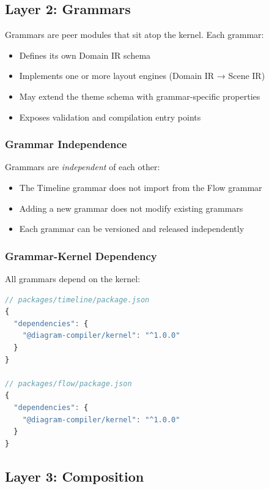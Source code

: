 \subsection{Layer 2: Grammars}
\label{sec:arch-grammars}

Grammars are peer modules that sit atop the kernel. Each grammar:

\begin{itemize}
  \item Defines its own Domain IR schema
  \item Implements one or more layout engines (Domain IR → Scene IR)
  \item May extend the theme schema with grammar-specific properties
  \item Exposes validation and compilation entry points
\end{itemize}

\subsubsection{Grammar Independence}

Grammars are \emph{independent} of each other:

\begin{itemize}
  \item The Timeline grammar does not import from the Flow grammar
  \item Adding a new grammar does not modify existing grammars
  \item Each grammar can be versioned and released independently
\end{itemize}

\subsubsection{Grammar-Kernel Dependency}

All grammars depend on the kernel:

\begin{lstlisting}[language=javascript,caption={Grammar dependency structure}]
// packages/timeline/package.json
{
  "dependencies": {
    "@diagram-compiler/kernel": "^1.0.0"
  }
}

// packages/flow/package.json
{
  "dependencies": {
    "@diagram-compiler/kernel": "^1.0.0"
  }
}
\end{lstlisting}

\subsection{Layer 3: Composition}
\label{sec:arch-composition}

